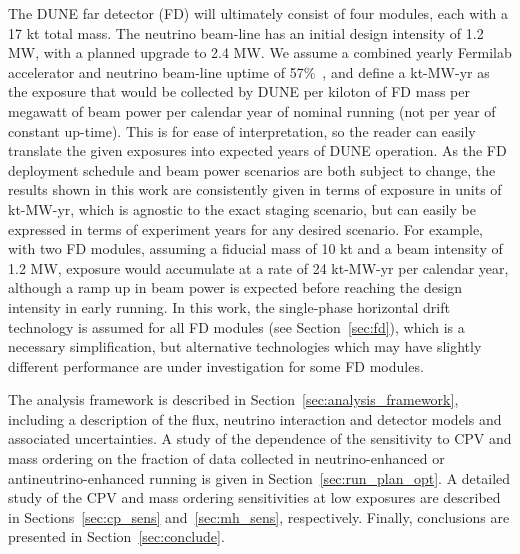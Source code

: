 The DUNE far detector (FD) will ultimately consist of four modules, each with a 17 kt total mass. The neutrino beam-line has an initial design intensity of 1.2 MW, with a planned upgrade to 2.4 MW. We assume a combined yearly Fermilab accelerator and neutrino beam-line uptime of 57\%~\cite{Abi:2020evt}, and define a kt-MW-yr as the exposure that would be collected by DUNE per kiloton of FD mass per megawatt of beam power per calendar year of nominal running (not per year of constant up-time). This is for ease of interpretation, so the reader can easily translate the given exposures into expected years of DUNE operation. As the FD deployment schedule and beam power scenarios are both subject to change, the results shown in this work are consistently given in terms of exposure in units of kt-MW-yr, which is agnostic to the exact staging scenario, but can easily be expressed in terms of experiment years for any desired scenario. For example, with two FD modules, assuming a fiducial mass of 10 kt and a beam intensity of 1.2 MW, exposure would accumulate at a rate of 24 kt-MW-yr per calendar year, although a ramp up in beam power is expected before reaching the design intensity in early running. In this work, the single-phase horizontal drift technology is assumed for all FD modules (see Section~\ref{sec:fd}), which is a necessary simplification, but alternative technologies which may have slightly different performance are under investigation for some FD modules.

The analysis framework is described in Section~\ref{sec:analysis_framework}, including a description of the flux, neutrino interaction and detector models and associated uncertainties. A study of the dependence of the sensitivity to CPV and mass ordering on the fraction of data collected in neutrino-enhanced or antineutrino-enhanced running is given in Section~\ref{sec:run_plan_opt}. A detailed study of the CPV and mass ordering sensitivities at low exposures are described in Sections~\ref{sec:cp_sens} and~\ref{sec:mh_sens}, respectively. Finally, conclusions are presented in Section~\ref{sec:conclude}.

